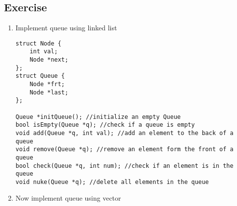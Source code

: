 \documentclass[12pt]{article}
\begin{document}
\subsection{Exercise}
\begin{enumerate}
    \item Implement queue using linked list
    \begin{verbatim}
struct Node {
    int val;
    Node *next;
};
struct Queue {
    Node *frt;
    Node *last;
};

Queue *initQueue(); //initialize an empty Queue
bool isEmpty(Queue *q); //check if a queue is empty
void add(Queue *q, int val); //add an element to the back of a queue
void remove(Queue *q); //remove an element form the front of a queue
bool check(Queue *q, int num); //check if an element is in the queue
void nuke(Queue *q); //delete all elements in the queue
    \end{verbatim}
    \item Now implement queue using vector
\end{enumerate}
\end{document}
